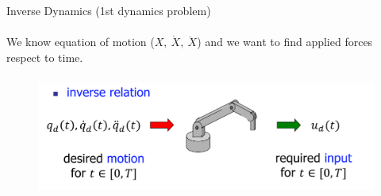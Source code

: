 \documentclass[aspectratio=169]{beamer}
\begin{document}
\begin{frame}[t]{Inverse Dynamics  (1st dynamics problem)}
    \framesubtitle{}
        We know equation of motion ($X,\ \dot{X},\ \ddot{X}$) and we want to find applied forces respect to time.
        \begin{figure}[H]
            \centering\includegraphics[height=4cm,width=1\textwidth,keepaspectratio]{inverse_dynamics.png}
            \label{fig:inverse_dynamics.png}
        \end{figure}
    \end{frame}
\end{document}
